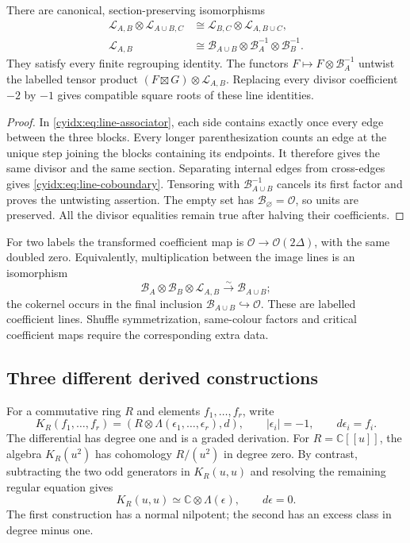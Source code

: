 \begin{proposition}\label{cyidx:prop:flags}
There are canonical, section-preserving isomorphisms
\begin{align}
 \mathcal L_{A,B}\otimes\mathcal L_{A\cup B,C}
 &\cong\mathcal L_{B,C}\otimes\mathcal L_{A,B\cup C},
       \label{cyidx:eq:line-associator}\\
 \mathcal L_{A,B}
 &\cong\mathcal B_{A\cup B}\otimes
             \mathcal B_A^{-1}\otimes\mathcal B_B^{-1}.
       \label{cyidx:eq:line-coboundary}
\end{align}
They satisfy every finite regrouping identity.
The functors \(F\mapsto F\otimes\mathcal B_A^{-1}\)
untwist the labelled tensor product
\((F\boxtimes G)\otimes\mathcal L_{A,B}\).
Replacing every divisor coefficient \(-2\) by \(-1\)
gives compatible square roots of these line identities.
\end{proposition}
\begin{proof}
In \eqref{cyidx:eq:line-associator}, each side contains
exactly once every edge between the three blocks.
Every longer parenthesization counts an edge at the
unique step joining the blocks containing its endpoints.
It therefore gives the same divisor and the same section.
Separating internal edges from cross-edges gives
\eqref{cyidx:eq:line-coboundary}. Tensoring with
\(\mathcal B_{A\cup B}^{-1}\) cancels its first factor
and proves the untwisting assertion. The empty set
has \(\mathcal B_\varnothing=\mathcal O\), so units
are preserved. All the divisor equalities remain true
after halving their coefficients.
\end{proof}

For two labels the transformed coefficient map is
\(\mathcal O\to\mathcal O(2\Delta)\), with the same
doubled zero. Equivalently, multiplication between the
image lines is an isomorphism
\[
 \mathcal B_A\otimes\mathcal B_B\otimes\mathcal L_{A,B}
       \xrightarrow{\sim}\mathcal B_{A\cup B};
\]
the cokernel occurs in the final inclusion
\(\mathcal B_{A\cup B}\hookrightarrow\mathcal O\).
These are labelled coefficient lines. Shuffle
symmetrization, same-colour factors and critical
coefficient maps require the corresponding extra data.

\subsection{Three different derived constructions}

For a commutative ring \(R\) and elements \(f_1,\ldots,f_r\),
write
\[
 K_R(f_1,\ldots,f_r)=
 (R\otimes\Lambda(\epsilon_1,\ldots,\epsilon_r),d),
 \qquad |\epsilon_i|=-1,\qquad d\epsilon_i=f_i.
\]
The differential has degree one and is a graded derivation.
For \(R=\mathbb C[[u]]\), the algebra \(K_R(u^2)\)
has cohomology \(R/(u^2)\) in degree zero. By contrast,
subtracting the two odd generators in \(K_R(u,u)\)
and resolving the remaining regular equation gives
\[
 K_R(u,u)\simeq\mathbb C\otimes\Lambda(\epsilon),
                  \qquad d\epsilon=0.
\]
The first construction has a normal nilpotent; the second
has an excess class in degree minus one.

